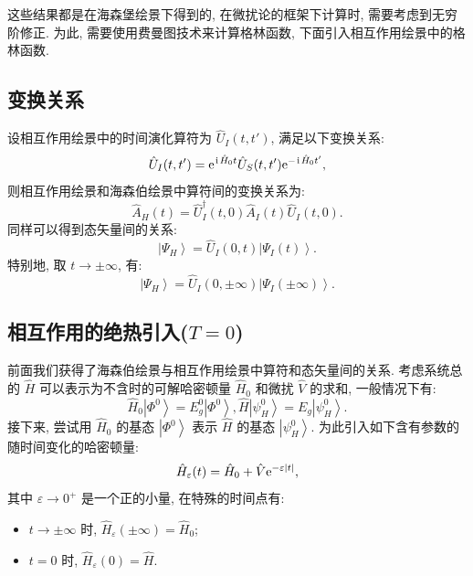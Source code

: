 这些结果都是在海森堡绘景下得到的, 在微扰论的框架下计算时, 需要考虑到无穷阶修正. 为此, 需要使用费曼图技术来计算格林函数, 下面引入相互作用绘景中的格林函数.
\subsection{变换关系}
设相互作用绘景中的时间演化算符为 $\hat U_I(t,t')$, 满足以下变换关系:
\begin{equation}\hat U_I(t,t')=\mathrm{e}^{\hspace{0.1em}\mathrm{i}\hspace{0.1em}\hat H_0 t}\hat U_S(t,t')\mathrm{e}^{-\hspace{0.1em}\mathrm{i}\hspace{0.1em}\hat H_0 t'},\end{equation}
则相互作用绘景和海森伯绘景中算符间的变换关系为:
\begin{equation}
\hat{A}_{H}(t) =\hat U_I^\dagger(t, 0) \hat{A}_{I}(t) \hat U_I(t, 0).
\end{equation}
同样可以得到态矢量间的关系:
\begin{equation}
\left|\Psi_{H}\right\rangle =\hat U_I(0, t)\left|\Psi_{I}(t)\right\rangle.
\end{equation}
特别地, 取 $t \rightarrow \pm \infty$, 有:
\begin{equation}
\left|\Psi_{H}\right\rangle=\hat U_I(0, \pm \infty)\left|\Psi_{I}(\pm \infty)\right\rangle.
\end{equation}
\subsection{相互作用的绝热引入($T=0$)}
前面我们获得了海森伯绘景与相互作用绘景中算符和态矢量间的关系. 考虑系统总的 $\hat{H}$ 可以表示为不含时的可解哈密顿量 $\hat{H}_{0}$ 和微扰 $\hat{V}$ 的求和, 一般情况下有:
\begin{equation}
\hat{H}_{0}\left|\Phi^{0}\right\rangle=E_{g}^{0}\left|\Phi^{0}\right\rangle , \hat{H}\left|\psi_{H}^{0}\right\rangle=E_{g}\left|\psi_{H}^{0}\right\rangle.
\end{equation}
接下来, 尝试用 $\hat{H}_{0}$ 的基态 $\left|\Phi^{0}\right\rangle$ 表示 $\hat{H}$ 的基态 $\left|\psi_{H}^{0}\right\rangle$. 为此引入如下含有参数的随时间变化的哈密顿量:
\begin{equation}
\hat{H}_{\varepsilon}(t)=\hat{H}_{0}+\hat{V} \mathrm{e}^{-\varepsilon|t|},
\end{equation}
其中 $\varepsilon \rightarrow 0^{+}$ 是一个正的小量, 在特殊的时间点有:
\begin{itemize}
\item $t \rightarrow \pm \infty$ 时, $\hat{H}_{\varepsilon}(\pm \infty)=\hat{H}_{0}$;
\item $t=0$ 时, $\hat{H}_{\varepsilon}(0)=\hat{H}$.
\end{itemize}

